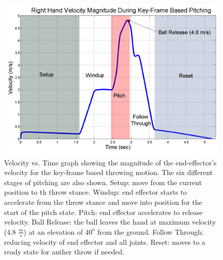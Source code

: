 \begin{figure}[t]
  \centering
\includegraphics[width=1.0\columnwidth]{./fig/keyFrameThrow4.pdf}
  \caption{Velocity vs. Time graph showing the magnitude of the end-effector's velocity for the key-frame based throwing motion.  The six different stages of pitching are also shown.  Setup: move from the current position to th throw stance.  Windup: end effector starts to accelerate from the throw stance and move into position for the start of the pitch state. Pitch: end effector accelerates to release velocity.  Ball Release: the ball leaves the hand at maximum velocity (4.8 $\frac{m}{s}$) at an elevation of $40^o$ from the ground.  Follow Through: reducing velocity of end effector and all joints.  Reset: moves to a ready state for anther throw if needed.}
  \label{fig:keyframe-graph}
\end{figure}